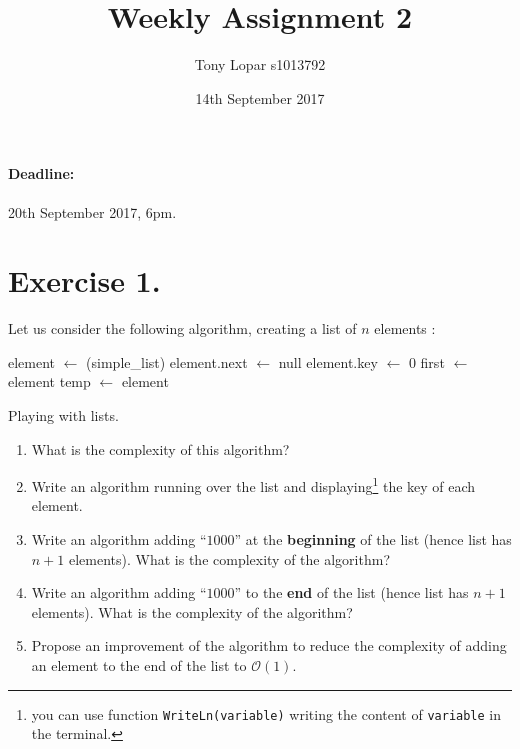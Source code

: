 \documentclass{article}
\begin{document}
\title{Weekly Assignment 2}
\author{Tony Lopar s1013792}
\date{14th September 2017}
\maketitle

\paragraph{Deadline:} 20th September 2017, 6pm.

\section*{Exercise 1.}
Let us consider the following algorithm, creating a list of $n$ elements :

\begin{algorithm}


 element $\leftarrow$ \New(simple\_list) \;
 element.next $\leftarrow$ null \;
 element.key $\leftarrow$ 0 \;
 first $\leftarrow$ element \;
 temp $\leftarrow$ element \;


 \caption{Playing with lists.}
\end{algorithm}
\vspace{-0.5cm}


\begin{enumerate}
\item What is the complexity of this algorithm?
\item Write an algorithm running over the list and displaying\footnote{you can use function \texttt{WriteLn(variable)} writing the content of \texttt{variable} in the terminal.} the key of each element.
\item Write an algorithm adding ``$1000$'' at the \textbf{beginning} of the list (hence list has $n+1$ elements). What is the complexity of the algorithm?
\item Write an algorithm adding ``$1000$'' to the \textbf{end} of the list (hence list has $n+1$ elements). What is the complexity of the algorithm?
\item Propose an improvement of the algorithm to reduce the complexity of adding an element to the end of the list to $\mathcal{O}(1)$.
\end{enumerate}
\end{document}
